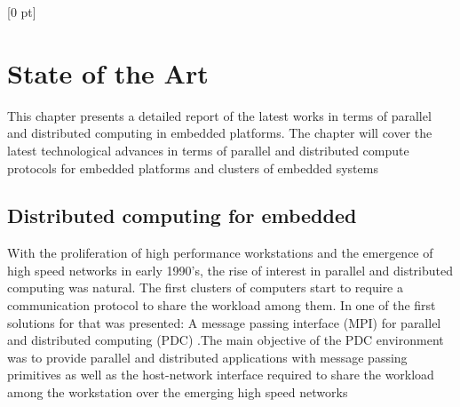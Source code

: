 \titlespacing{\chapter}{0 pt}{30 pt}{50 pt}[0 pt]
\titleformat{\section}{\Large\bfseries}{\thesection}{0 pt}{\hspace{30 pt}}
\titleformat{\subsection}{\large\bfseries}{\thesubsection}{0 pt}{\hspace{30 pt}}
\pagestyle{fancy}
\fancyhead[LO,LE]{\footnotesize\textit{\leftmark}}
\fancyhead[RO,RE]{\thepage}
\fancyfoot[CO,CE]{}

\chapter{State of the Art} %

\normalsize

\noindent

This chapter presents a detailed report of the latest works in terms of parallel
and distributed computing in embedded platforms. The chapter will cover the
latest technological advances in terms of  parallel and distributed compute
protocols for embedded platforms and clusters of embedded systems

\section{Distributed computing for embedded}

With the proliferation of high performance workstations and the emergence of
high speed networks in early 1990's, the rise of interest in parallel and
distributed computing was natural. The first clusters of computers start to
require a communication protocol to share the workload among them. In
\cite{Salim} one of the first solutions for that was presented: A message
passing interface (MPI) for parallel and distributed computing (PDC) .The main
objective of the PDC environment was to provide parallel and distributed
applications with message passing primitives as well as the host-network
interface required to share the workload among the workstation over the
emerging high speed networks

